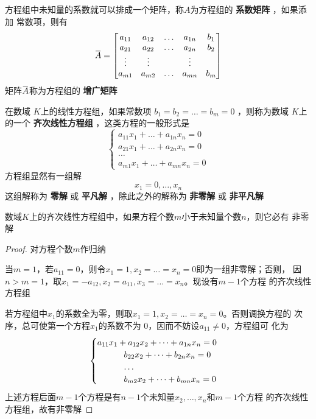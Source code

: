 \documentclass[11pt]{article}
\begin{document}
方程组中未知量的系数就可以排成一个矩阵，称\(A\)为方程组的 \textbf{系数矩阵} ，如果添加
常数项，则有
\begin{equation*}
\bbar{A}=
\begin{bmatrix}
a_{11}&a_{12}&\dots&a_{1n}&b_1\\
a_{21}&a_{22}&\dots&a_{2n}&b_2\\
\vdots&\vdots&&\vdots\\
a_{m1}&a_{m2}&\dots&a_{mn}&b_m
\end{bmatrix}
\end{equation*}
矩阵\(\bbar{A}\)称为方程组的 \textbf{增广矩阵}

在数域 \(K\)上的线性方程组，如果常数项 \(b_1=b_2=\dots=b_m=0\) ，则称为数域
\(K\)上的一个 \textbf{齐次线性方程组} ，这类方程的一般形式是
\begin{equation*}
\begin{cases}
a_{11}x_1+\dots+a_{1n}x_n=0\\
a_{21}x_1+\dots+a_{2n}x_n=0\\
\dots\\
a_{m1}x_1+\dots+a_{mn}x_n=0
\end{cases}
\end{equation*}
方程组显然有一组解
\begin{equation*}
x_1=0,\dots,x_n
\end{equation*}
这组解称为 \textbf{零解} 或 \textbf{平凡解} ，除此之外的解称为 \textbf{非零解} 或 \textbf{非平凡解}

\begin{proposition}[]
数域\(K\)上的齐次线性方程组中，如果方程个数\(m\)小于未知量个数\(n\)，则它必有
非零解
\end{proposition}

\begin{proof}
对方程个数\(m\)作归纳

当\(m=1\)，若\(a_{11}=0\)，则令\(x_1=1,x_2=\dots=x_n=0\)即为一组非零解；否则，
因\(n\iffalse<\fi>m=1\)，取\(x_1=-a_{12},x_2=a_{11},x_3=\dots=x_n\)。现设有\(m-1\)个方程
的齐次线性方程组

若方程组中\(x_1\)的系数全为零，则取\(x_1=1,x_2=\dots=x_n=0\)。否则调换方程的
次序，总可使第一个方程\(x_1\)的系数不为 0，因而不妨设\(a_{11}\neq0\)，方程组可
化为
\begin{equation*}
\begin{cases}
a_{11}x_1+a_{12}x_2+\dots+a_{1n}x_n=0\\
\hspace{1.1cm}b_{22}x_2+\dots+b_{2n}x_n=0\\
\hspace{1.1cm}\dots\\
\hspace{1.1cm}b_{m2}x_2+\dots+b_{mn}x_n=0
\end{cases}
\end{equation*}
上述方程后面\(m-1\)个方程是有\(n-1\)个未知量\(x_2,\dots,x_n\)和\(m-1\)个方程
的齐次线性方程组，故有非零解
\end{proof}
\end{document}
